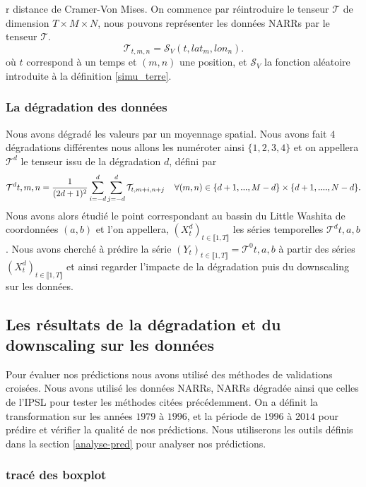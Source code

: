 \documentclass[a4paper,11pt]{article}
\begin{document}
r distance de Cramer-Von Mises. 
On commence par réintroduire le tenseur $\mathcal{T}$ de dimension $T \times M\times N$, nous pouvons représenter les données NARRs par le tenseur $\mathcal{T}$. 
\[\mathcal{T}_{t,m,n}=\mathcal{S}_V(t,lat_m,lon_n).\]
où $t$ correspond à un temps et $(m,n)$ une position, et $\mathcal{S}_V$ la fonction aléatoire introduite à la définition \ref{simu_terre}.

\subsubsection{La dégradation des données}

\label{deg-NARR}

Nous avons dégradé les valeurs par un moyennage spatial. Nous avons fait $4$ dégradations différentes nous allons les numéroter ainsi $\{1,2,3,4\}$ et on appellera $\mathcal{T}^{d}$ le tenseur issu de la dégradation $d$, défini par
\begin{equation}
	\label{eq-degradation}
	\mathcal{T}^{d}{t,m,n}=\frac{1}{(2d+1)^2} \sum_{i=-d}^{d}\sum_{j=-d}^{d}\mathcal{T}_{t,m+i,n+j} \hspace{4mm} \forall (m,n) \in \{d+1,...,M-d\}\times\{d+1,...., N-d\}.
\end{equation} 
Nous avons alors étudié le point correspondant au bassin du Little Washita de coordonnées $(a,b)$ et l'on appellera, $(X^d_t)_{t\in \llbracket 1,T \rrbracket}$ les séries temporelles $\mathcal{T}^{d}{t,a,b}$. Nous avons cherché à prédire la série $(Y_t)_{t \in \llbracket 1,T \rrbracket}= \mathcal{T}^{0}{t,a,b}$ à partir des séries $(X^d_t)_{t\in \llbracket 1,T \rrbracket}$ et ainsi regarder l'impacte de la dégradation puis du downscaling sur les données.


\subsection{Les résultats de la dégradation et du downscaling sur les données}
\label{resultats}
Pour évaluer nos prédictions nous avons utilisé des méthodes de validations croisées. Nous avons utilisé les données NARRs, NARRs dégradée ainsi que celles de l'IPSL pour tester les méthodes citées précédemment. On a définit la transformation sur les années $1979$ à $1996$, et la période de $1996$ à $2014$ pour prédire et vérifier la qualité de nos prédictions. Nous utiliserons les outils définis dans la section \ref{analyse-pred} pour analyser nos prédictions.

\subsubsection{tracé des boxplot}
\end{document}
